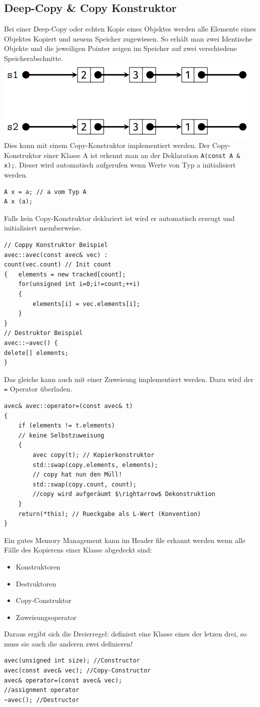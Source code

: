 \subsection{Deep-Copy \& Copy Konstruktor}
Bei einer Deep-Copy oder echten Kopie eines Objektes werden alle Elemente eines Objektes Kopiert und neuem Speicher zugewiesen. 
So erhält man zwei Identische Objekte und die jeweiligen Pointer zeigen im Speicher auf zwei verschiedene Speicherabschnitte.
\includegraphics[width=0.24 \textwidth]{images/DeepCopy}
Dies kann mit einem Copy-Konstruktor implementiert werden. 
Der Copy-Konstruktor einer Klasse A ist erkennt man an der Deklaration \texttt{A(const A \& x);}. 
Dieser wird automatisch aufgerufen wenn Werte von Typ a initialisiert werden.
\begin{lstlisting}[mathescape]
A x = a; // a vom Typ A
A x (a);

\end{lstlisting}
Falls kein Copy-Konstruktor deklariert ist wird er automatisch erzeugt und initialisiert memberweise.
\begin{lstlisting}[mathescape]
// Coppy Konstruktor Beispiel
avec::avec(const avec& vec) : 
count(vec.count) // Init count
{	elements = new tracked[count];
	for(unsigned int i=0;i!=count;++i) 
	{
		elements[i] = vec.elements[i];
	}
}
// Destruktor Beispiel
avec::~avec() {
delete[] elements;
}
\end{lstlisting}

Das gleiche kann auch mit einer Zuweisung implementiert werden.
Dazu wird der \texttt{=} Operator überladen.
\begin{lstlisting}[mathescape]
avec& avec::operator=(const avec& t) 
{
	if (elements != t.elements) 
	// keine Selbstzuweisung
	{
		avec copy(t); // Kopierkonstruktor
		std::swap(copy.elements, elements);  
		// copy hat nun den Müll!
		std::swap(copy.count, count); 
		//copy wird aufgeräumt $\rightarrow$ Dekonstruktion
	}
	return(*this); // Rueckgabe als L-Wert (Konvention)
}
\end{lstlisting}
Ein gutes Memory Management kann im Header file erkannt werden wenn alle Fälle des Kopierens einer Klasse abgedeckt sind:
\begin{itemize}
	\item Konstruktoren
	\item Destruktoren
	\item Copy-Construktor
	\item Zuweisungsoperator
\end{itemize}
Daraus ergibt sich die Dreierregel: definiert eine Klasse eines der letzen drei, so muss sie auch die anderen zwei definieren!

\begin{lstlisting}[mathescape]
avec(unsigned int size); //Constructor
avec(const avec& vec); //Copy-Constructor
avec& operator=(const avec& vec);
//assignment operator
~avec(); //Destructor
\end{lstlisting}













